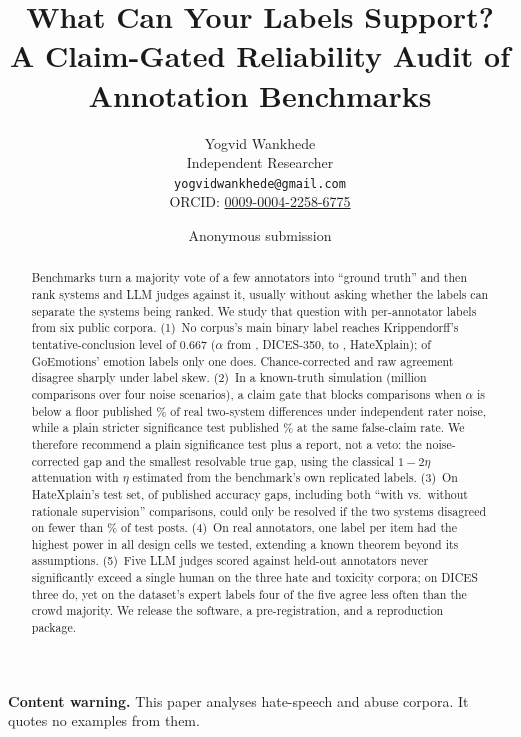 \documentclass[11pt]{article}
\title{What Can Your Labels Support?\\A Claim-Gated Reliability Audit of Annotation Benchmarks}
\author{Yogvid Wankhede\\Independent Researcher\\\texttt{yogvidwankhede@gmail.com}\\ORCID: \href{https://orcid.org/0009-0004-2258-6775}{0009-0004-2258-6775}}
\author{Anonymous submission}
\begin{document}
\maketitle

\begin{abstract}
Benchmarks turn a majority vote of a few annotators into ``ground truth'' and then rank systems and LLM judges against it, usually without asking whether the labels can separate the systems being ranked. We study that question with per-annotator labels from six public corpora. (1)~No corpus's main binary label reaches Krippendorff's tentative-conclusion level of 0.667 ($\alpha$ from \alphaDthree, DICES-350, to \alphaHx, HateXplain); of GoEmotions' \nGoEmotions emotion labels only one does. Chance-corrected and raw agreement disagree sharply under label skew. (2)~In a known-truth simulation (\simComparisonsAll million comparisons over four noise scenarios), a claim gate that blocks comparisons when $\alpha$ is below a floor published \simResVoneIid\% of real two-system differences under independent rater noise, while a plain stricter significance test published \simResMatchedIid\% at the same false-claim rate. We therefore recommend a plain significance test plus a report, not a veto: the noise-corrected gap and the smallest resolvable true gap, using the classical $1-2\eta$ attenuation with $\eta$ estimated from the benchmark's own replicated labels. (3)~On HateXplain's test set, \retroUnresolvable of \retroPairs published accuracy gaps, including both ``with vs.\ without rationale supervision'' comparisons, could only be resolved if the two systems disagreed on fewer than \retroBertPmax\% of test posts. (4)~On real annotators, one label per item had the highest power in all \clFourCells design cells we tested, extending a known theorem beyond its assumptions. (5)~Five LLM judges scored against held-out annotators never significantly exceed a single human on the three hate and toxicity corpora; on DICES three do, yet on the dataset's expert labels four of the five agree less often than the crowd majority. We release the software, a pre-registration, and a reproduction package.
\end{abstract}

\noindent\textbf{Content warning.} This paper analyses hate-speech and abuse corpora. It quotes no examples from them.
\end{document}
